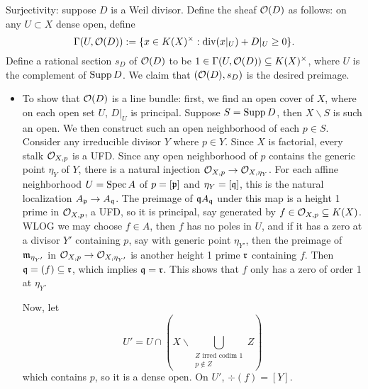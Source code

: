 \documentclass[11pt]{amsart}
\begin{document}
Surjectivity: suppose $D$ is a Weil divisor. Define the sheaf $\mathcal{O}(D)$ as follows: on any $U\subset X$ dense open, define
\[\Gamma(U, \mathcal{O}(D)) := \{x\in K(X)^\times: \operatorname{div}(x|_U) + D|_U \ge 0 \}.\]
Define a rational section $s_D$ of $\mathcal{O}(D)$ to be $1\in \Gamma(U, \mathcal{O}(D)) \subseteq K(X)^\times$, where $U$ is the complement of $\operatorname{Supp} D$. We claim that $(\mathcal{O}(D), s_D)$ is the desired preimage.
\begin{itemize}
    \item To show that $\mathcal{O}(D)$ is a line bundle: first, we find an open cover of $X$, where on each open set $U$, $D|_U$ is principal. Suppose $S = \operatorname{Supp} D$, then $X\backslash S$ is such an open. We then construct such an open neighborhood of each $p\in S$. Consider any irreducible divisor $Y$ where $p\in Y$. Since $X$ is factorial, every stalk $\mathcal{O}_{X,p}$ is a UFD. Since any open neighborhood of $p$ contains the generic point $\eta_Y$ of $Y$, there is a natural injection $\mathcal{O}_{X,p} \to \mathcal{O}_{X,\eta_Y}$. For each affine neighborhood $U = \operatorname{Spec} A$ of $p = [\mathfrak{p}]$ and $\eta_Y = [\mathfrak{q}]$, this is the natural localization $A_{\mathfrak{p}} \to A_{\mathfrak{q}}$. The preimage of $\mathfrak{q} A_{\mathfrak{q}}$ under this map is a height 1 prime in $\mathcal{O}_{X,p}$, a UFD, so it is principal, say generated by $f \in \mathcal{O}_{X,p} \subseteq K(X)$. WLOG we may choose $f\in A$, then $f$ has no poles in $U$, and if it has a zero at a divisor $Y'$ containing $p$, say with generic point $\eta_{Y'}$, then the preimage of $\mathfrak{m}_{\eta_{Y'}}$ in $\mathcal{O}_{X,p}\to \mathcal{O}_{X, \eta_{Y'}}$ is another height 1 prime $\mathfrak{r}$ containing $f$. Then $\mathfrak{q} = (f) \subseteq \mathfrak{r}$, which implies $\mathfrak{q} = \mathfrak{r}$. This shows that $f$ only has a zero of order 1 at $\eta_Y$. 

Now, let
\[U' = U\cap (X\backslash \bigcup_{\substack{Z \text{ irred codim } 1 \\ p\notin Z}} Z )\]
which contains $p$, so it is a dense open. On $U'$, $\div(f) = [Y]$.


\end{itemize}
\end{document}

